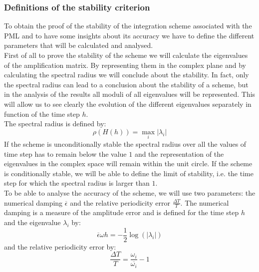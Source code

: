 \subsubsection{Definitions of the stability criterion}
To obtain the proof of the stability of the integration scheme associated with the PML and to have some insights about its accuracy we have to define the different parameters that will be calculated and analysed. \\
First of all to prove the stability of the scheme we will calculate the eigenvalues of the amplification matrix. By representing them in the complex plane and by calculating the spectral radius we will conclude about the stability. In fact, only the spectral radius can lead to a conclusion about the stability of a scheme, but in the analysis of the results all moduli of all eigenvalues will be represented. This will allow us to see clearly the evolution of the different eigenvalues separately in function of the time step $h$.\\ 
The spectral radius is defined by:
\begin{equation}
\rho(H(h)) = \max_i |\lambda_i| 
\end{equation}
If the scheme is unconditionally stable the spectral radius over all the values of time step has to remain below the value $1$ and the representation of the eigenvalues in the complex space will remain within the unit circle. If the scheme is conditionally stable, we will be able to define the limit of stability, i.e. the time step for which the spectral radius is larger than $1$.\\
To be able to analyse the accuracy of the scheme, we will use two parameters: the numerical damping $\overline{\epsilon}$ and the relative periodicity error $\frac{\Delta T}{T}$. The numerical damping is a measure of the amplitude error and is defined for the time step $h$ and the eigenvalue $\lambda_i$ by: 
\begin{equation}
\overline{\epsilon} \omega h = -\frac{1}{2}\log(|\lambda_i|)
\end{equation}      
and the relative periodicity error by:
\begin{equation}
\frac{\Delta T}{T} = \frac{\omega_i}{\overline{\omega_i}} - 1
\end{equation}

